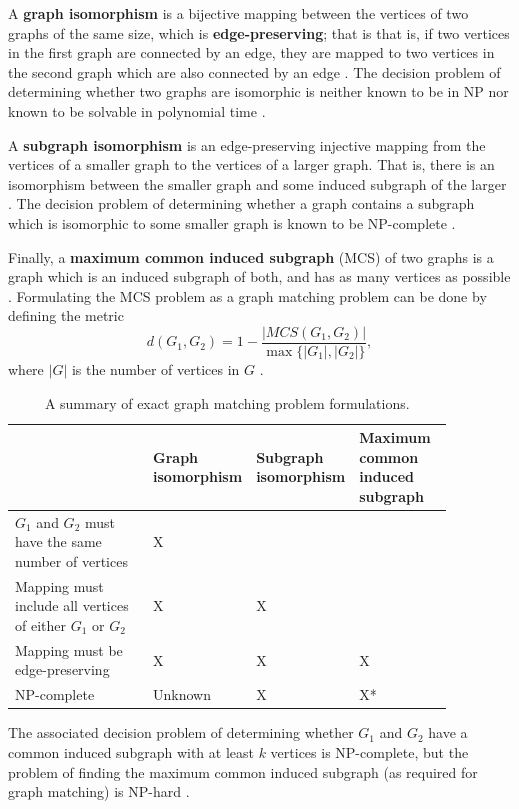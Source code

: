 \documentclass[12pt]{thesis}
\theoremstyle{plain}
\theoremstyle{definition}
\theoremstyle{remark}
\begin{document}
A \textbf{graph isomorphism} is a bijective mapping between the vertices of two graphs of the same size, which is \textbf{edge-preserving}; that is  that is, if two vertices in the first graph are connected by an edge, they are mapped to two vertices in the second graph which are also connected by an edge \cite{Conte_2004}. The decision problem of determining whether two graphs are isomorphic is neither known to be in NP nor known to be solvable in polynomial time \cite{wikiGraphIsomorphism}.

A \textbf{subgraph isomorphism} is an edge-preserving injective mapping from the vertices of a smaller graph to the vertices of a larger graph. That is, there is an isomorphism between the smaller graph and some induced subgraph of the larger \cite{Conte_2004}. The decision problem of determining whether a graph contains a subgraph which is isomorphic to some smaller graph is known to be NP-complete \cite{wikiSubgraphIsomorphism}.

Finally, a \textbf{maximum common induced subgraph} (MCS) of two graphs is a graph which is an induced subgraph of both, and has as many vertices as possible  \cite{wikiMaximumCommonSubgraph}. Formulating the MCS problem as a graph matching problem can be done by defining the metric \[d(G_1,G_2) = 1 - \frac{|MCS(G_1,G_2)|}{\max\{|G_1|,|G_2|\}},\] where $|G|$ is the number of vertices in $G$ \cite{Bunke_1998,Bunke_1997}.

\begin{table}[h]
\centering
\begin{tabular}{|L{0.35\linewidth}|L{0.15\linewidth}|L{0.15\linewidth}|L{0.22\linewidth}|}
\hline
 & Graph isomorphism & Subgraph isomorphism & Maximum common induced subgraph \\ \hline
$G_1$ and $G_2$ must have the same number of vertices & X & & \\ \hline
Mapping must include all vertices of either $G_1$ or $G_2$ & X & X & \\ \hline
Mapping must be edge-preserving & X & X & X \\ \hline
NP-complete & Unknown & X & X* \\ \hline
\end{tabular}
\flushleft\footnotesize *The associated decision problem of determining whether $G_1$ and $G_2$ have a common induced subgraph with at least $k$ vertices is NP-complete, but the problem of finding the maximum common induced subgraph (as required for graph matching) is NP-hard \cite{wikiMaximumCommonSubgraph}.
\caption{A summary of exact graph matching problem formulations.}
\label{NP_classifications}
\end{table}
\end{document}
